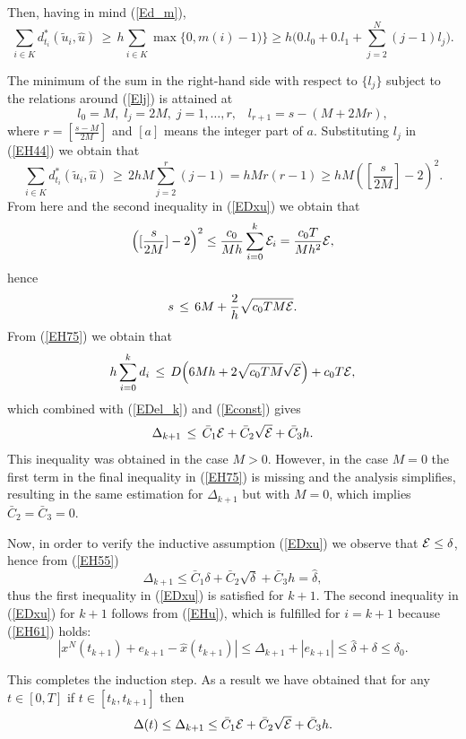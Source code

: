 \documentclass[11pt]{article}
\newcommand{\bd}{\begin{displaymath}}
\newcommand{\ed}{\end{displaymath}}
\newcommand{\be}{\begin{equation}}
\newcommand{\ee}{\end{equation}}
\newcommand{\E}{{\cal E}}
\begin{document}
Then, having in mind (\ref{Ed_m}),
\be \label{EH44}
        \sum_{i \in K} d^*_{t_i}(\tilde u_i, \hat u) \,\geq\,  h \sum_{i \in K} \max\{ 0, m(i) - 1 ) \}  \geq 
                h\Big( 0.l_0 + 0. l_1 + \sum_{j=2}^N (j-1) l_j \Big).
\ee

The minimum of the sum in the right-hand side with respect to $\{l_j\}$ subject to the relations around (\ref{Elj})
is attained at
\bd
           l_0 = M, \; l_j = 2M, \; j = 1, \ldots, r, \;\;\; l_{r+1} = s - (M + 2Mr),   
\ed
where $r = \left[ \frac{s-M}{2M}\right]$ and $[a]$ means the integer part of $a$. Substituting $l_j$ in (\ref{EH44})
we obtain that
\bd
     \sum_{i \in K} d^*_{t_i}(\tilde u_i, \hat u) \,\geq\,  2 h M \sum_{j=2}^{r} (j-1) = hM r (r-1) \geq 
                hM \left( \left[ \frac{s}{2M}\right] -2\right)^2.
\ed
From here and the second inequality in (\ref{EDxu}) we obtain that
\bd
     \Big([\frac{s}{2M}] - 2\Big)^2 \leq \frac{c_0}{Mh} \sum_{i=0}^k \E_{i} = \frac{c_0 T}{Mh^2} \E,  
\ed
hence
\bd
       s \,\leq\, 6M +  \frac{2}{h} \sqrt{c_0TM \E}. 
\ed
From (\ref{EH75})  we obtain that 
\be \label{Esdi}
      h \sum_{i=0}^k d_i \,\leq\,  D \Big( 6Mh  + 2 \sqrt{c_0 TM} \sqrt{\E}\Big) +  c_0 T \E,
\ee
which combined with (\ref{EDel_k}) and (\ref{Econst}) gives
\be \label{EH55}
       \Delta_{k+1} \,\leq\, \bar C_1 \E + \bar C_2 \sqrt{\E} + \bar C_3 h.
\ee
This inequality was obtained in the case $M > 0$. However, in the case $M = 0$ the first term in the final inequality  
in (\ref{EH75}) is missing and the analysis simplifies, resulting in the same estimation for $\Delta_{k+1}$
but with $M = 0$, which implies $\bar C_2 = \bar C_3 = 0$.

Now, in order to verify  the inductive assumption (\ref{EDxu}) we observe that $\E \leq \delta$, hence from (\ref{EH55})
\bd
             \Delta_{k+1} \leq   \bar C_1 \delta + \bar C_2 \sqrt{\delta} + \bar C_3 h = \hat \delta,
\ed
thus the first inequality in  (\ref{EDxu}) is satisfied for $k+1$. 
The second inequality in (\ref{EDxu}) for $k+1$ follows from (\ref{EHu}), which is fulfilled for $i=k+1$
because (\ref{EH61}) holds: 
\bd
     |x^N(t_{k+1}) + e_{k+1} - \hat x(t_{k+1}) | \leq \Delta_{k+1} + |e_{k+1}| \leq \hat \delta + \delta \leq \delta_0.
\ed

This completes the induction step. As a result we have obtained that for any $t \in [0,T]$ if $t \in [t_k,t_{k+1}]$
then
\be \label{EDel_t}
              \Delta(t)  \leq \Delta_{k+1} \leq  \bar C_1 \E + \bar C_2 \sqrt{\E} + \bar C_3 h. 
\ee
\end{document}
